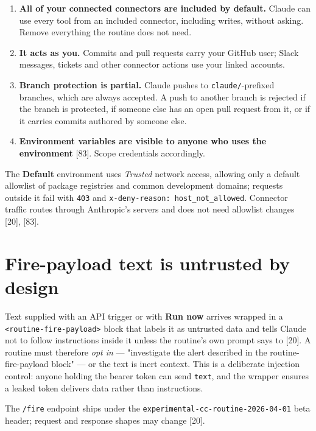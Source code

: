 \documentclass[11pt,a4paper,twoside,openany]{book}
\begin{document}
\begin{enumerate}
\item \textbf{All of your connected connectors are included by default.} Claude can use every tool from an included connector, including writes, without asking. Remove everything the routine does not need.
\item \textbf{It acts as you.} Commits and pull requests carry your GitHub user; Slack messages, tickets and other connector actions use your linked accounts.
\item \textbf{Branch protection is partial.} Claude pushes to \texttt{claude/\allowbreak{}}-prefixed branches, which are always accepted. A push to another branch is rejected if the branch is protected, if someone else has an open pull request from it, or if it carries commits authored by someone else.
\item \textbf{Environment variables are visible to anyone who uses the environment} [83]. Scope credentials accordingly.
\end{enumerate}

The \textbf{Default} environment uses \emph{Trusted} network access, allowing only a default allowlist of package registries and common development domains; requests outside it fail with \texttt{403} and \texttt{x-\allowbreak{}deny-\allowbreak{}reason:\allowbreak{} host\_\allowbreak{}not\_\allowbreak{}allowed}. Connector traffic routes through Anthropic's servers and does not need allowlist changes [20], [83].


\FloatBarrier
\setcounter{section}{2}
\section{Fire-payload text is untrusted by design}

Text supplied with an API trigger or with \textbf{Run now} arrives wrapped in a \texttt{<routine-\allowbreak{}fire-\allowbreak{}payload>} block that labels it as untrusted data and tells Claude not to follow instructions inside it unless the routine's own prompt says to [20]. A routine must therefore \emph{opt in} — "investigate the alert described in the routine-fire-payload block" — or the text is inert context. This is a deliberate injection control: anyone holding the bearer token can send \texttt{text}, and the wrapper ensures a leaked token delivers data rather than instructions.


The \texttt{/\allowbreak{}fire} endpoint ships under the \texttt{experimenta\allowbreak{}l-\allowbreak{}cc-\allowbreak{}routine-\allowbreak{}2026-\allowbreak{}04-\allowbreak{}01} beta header; request and response shapes may change [20].
\end{document}
